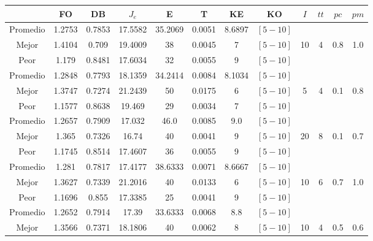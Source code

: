 \begin{table}[h!]
    \footnotesize
    \begin{center}
        \begin{tabular}{|c|c|c|c|c|c|c|c|c|c|c|c|}
        \hline
            & {\bf FO} & {\bf DB} & $J_e$ & {\bf E} & {\bf T} & {\bf KE} & {\bf KO} & $I$ & $tt$ & $pc$ & $pm$ \\
        \hline
        \hline
            Promedio  & 1.2753 & 0.7853 & 17.5582 & 35.2069 & 0.0051 & 8.6897 & $[5-10]$ &  &  &  & \\
            \cline{1-8}
            Mejor & 1.4104 & 0.709  & 19.4009 & 38 & 0.0045 & 7 & $[5-10]$ & 10 & 4 & 0.8 & 1.0\\
            \cline{1-8}
            Peor & 1.179 & 0.8481  & 17.6034 & 32 & 0.0055 & 9 & $[5-10]$ &  &  &  & \\
        \hline
        \hline
            Promedio  & 1.2848 & 0.7793 & 18.1359 & 34.2414 & 0.0084 & 8.1034 & $[5-10]$ &  &  &  & \\
            \cline{1-8}
            Mejor & 1.3747 & 0.7274  & 21.2439 & 50 & 0.0175 & 6 & $[5-10]$ & 5 & 4 & 0.1 & 0.8\\
            \cline{1-8}
            Peor & 1.1577 & 0.8638  & 19.469 & 29 & 0.0034 & 7 & $[5-10]$ &  &  &  & \\
        \hline
        \hline
            Promedio  & 1.2657 & 0.7909 & 17.032 & 46.0 & 0.0085 & 9.0 & $[5-10]$ &  &  &  & \\
            \cline{1-8}
            Mejor & 1.365 & 0.7326  & 16.74 & 40 & 0.0041 & 9 & $[5-10]$ & 20 & 8 & 0.1 & 0.7\\
            \cline{1-8}
            Peor & 1.1745 & 0.8514  & 17.4607 & 36 & 0.0055 & 9 & $[5-10]$ &  &  &  & \\
        \hline
        \hline
            Promedio  & 1.281 & 0.7817 & 17.4177 & 38.6333 & 0.0071 & 8.6667 & $[5-10]$ &  &  &  & \\
            \cline{1-8}
            Mejor & 1.3627 & 0.7339  & 21.2016 & 40 & 0.0133 & 6 & $[5-10]$ & 10 & 6 & 0.7 & 1.0\\
            \cline{1-8}
            Peor & 1.1696 & 0.855  & 17.3385 & 25 & 0.0041 & 9 & $[5-10]$ &  &  &  & \\
        \hline
        \hline
            Promedio  & 1.2652 & 0.7914 & 17.39 & 33.6333 & 0.0068 & 8.8 & $[5-10]$ &  &  &  & \\
            \cline{1-8}
            Mejor & 1.3566 & 0.7371  & 18.1806 & 40 & 0.0062 & 8 & $[5-10]$ & 10 & 4 & 0.5 & 0.6\\

\end{tabular}
\end{center}
\end{table}
